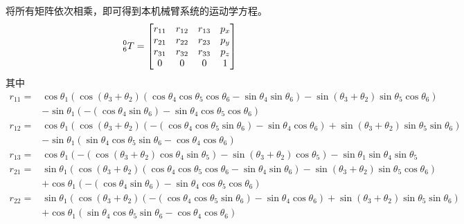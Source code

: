 \documentclass{ctexart}
\begin{document}
将所有矩阵依次相乘，即可得到本机械臂系统的运动学方程。
\[
    \prescript{0}{6}{T} = \begin{bmatrix}
        r_{11} & r_{12} & r_{13} & p_x \\
        r_{21} & r_{22} & r_{23} & p_y \\
        r_{31} & r_{32} & r_{33} & p_z \\
        0 & 0 & 0 & 1
    \end{bmatrix}
\]
其中
\[
    \begin{aligned}
        r_{11} = & \cos\theta_1 \left( \cos{\left( {{\theta }_3}+{{\theta }_2}\right) } \left( \cos\theta_4 \cos\theta_5 \cos\theta_6-\sin\theta_4 \sin\theta_6\right) - \sin{\left( {{\theta }_3}+{{\theta }_2}\right) } \sin\theta_5 \cos\theta_6\right) \\ 
        &-\sin\theta_1 \left( -\left( \cos\theta_4 \sin\theta_6\right) -\sin\theta_4 \cos\theta_5 \cos\theta_6\right)   \\
        r_{12} = & \cos\theta_1 \left( \cos{\left( {{\theta }_3}+{{\theta }_2}\right) } \left( -\left( \cos\theta_4 \cos\theta_5 \sin\theta_6\right) -\sin\theta_4 \cos\theta_6\right) +\sin{\left( {{\theta }_3}+{{\theta }_2}\right) } \sin\theta_5 \sin\theta_6\right) \\ 
        &-\sin\theta_1 \left( \sin\theta_4 \cos\theta_5 \sin\theta_6-\cos\theta_4 \cos\theta_6\right) \\
        r_{13} = & \cos\theta_1 \left( -\left( \cos{\left( {{\theta }_3}+{{\theta }_2}\right) } \cos\theta_4 \sin\theta_5\right) -\sin{\left( {{\theta }_3}+{{\theta }_2}\right) } \cos\theta_5\right) -\sin\theta_1 \sin\theta_4 \sin\theta_5 \\
        r_{21} = & \sin\theta_1 \left( \cos{\left( {{\theta }_3}+{{\theta }_2}\right) } \left( \cos\theta_4 \cos\theta_5 \cos\theta_6-\sin\theta_4 \sin\theta_6\right) -\sin{\left( {{\theta }_3}+{{\theta }_2}\right) } \sin\theta_5 \cos\theta_6\right) \\
        &+\cos\theta_1 \left( -\left( \cos\theta_4 \sin\theta_6\right) -\sin\theta_4 \cos\theta_5 \cos\theta_6\right) \\
        r_{22} = & \sin\theta_1 \left( \cos{\left( {{\theta }_3}+{{\theta }_2}\right) } \left( -\left( \cos\theta_4 \cos\theta_5 \sin\theta_6\right) -\sin\theta_4 \cos\theta_6\right) +\sin{\left( {{\theta }_3}+{{\theta }_2}\right) } \sin\theta_5 \sin\theta_6\right) \\
        & +\cos\theta_1 \left( \sin\theta_4 \cos\theta_5 \sin\theta_6-\cos\theta_4 \cos\theta_6\right) \\

\end{aligned}\]
\end{document}

